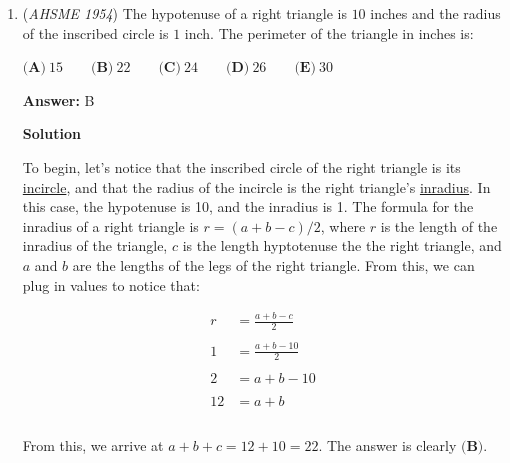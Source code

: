 \begin{enumerate}
\textbf{Solution 1}

Let us consider the vertices of the two parabolas. The x-coordinate of parabola 1 is given by $\frac{\frac{1}{2}}{2} = \frac{1}{4}$.

 Similarly, the x-coordinate of parabola 2 is given by $\frac{\frac{-1}{2}}{2} = -\frac{1}{4}$.

 From this information, we can deduce that $\textbf{(D)}\ \text{the graph of (1) is to the right of the graph of (2).}$, since the parabolas are the same shape.

 


	\item (\textit{AHSME 1954}) The hypotenuse of a right triangle is $10$ inches and the radius of the inscribed circle is $1$ inch. The perimeter of the triangle in inches is: 


 $\textbf{(A)}\ 15 \qquad \textbf{(B)}\ 22 \qquad \textbf{(C)}\ 24 \qquad \textbf{(D)}\ 26 \qquad \textbf{(E)}\ 30$

 \textbf{Answer: }B



\textbf{Solution}

To begin, let's notice that the inscribed circle of the right triangle is its \href{https://artofproblemsolving.com/wiki/index.php?title=Incircle}{incircle}, and that the radius of the incircle is the right triangle's \href{https://artofproblemsolving.com/wiki/index.php?title=Inradius}{inradius}. In this case, the hypotenuse is 10, and the inradius is 1. The formula for the inradius of a right triangle is $r = (a+b-c)/2$, where $r$ is the length of the inradius of the triangle, $c$ is the length hyptotenuse the the right triangle, and $a$ and $b$ are the lengths of the legs of the right triangle. From this, we can plug in values to notice that:

 
 \begin{align*} r & = \frac{a+b-c}{2}\\\\ 1 & = \frac{a+b-10}{2}\\\\ 2 & = a+b-10\\\\ 12 &= a+b\\\\ \end{align*}


 From this, we arrive at $a+b+c = 12+10 = 22$. The answer is clearly $\boxed{\textbf{(B)}}$.

 



\end{enumerate}
